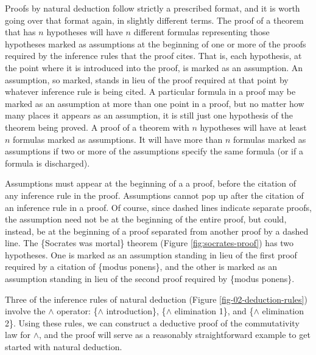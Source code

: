 Proofs by natural deduction follow strictly a prescribed format,
and it is worth going over that format again, in slightly different terms.
The proof of a theorem that has
$n$ hypotheses will have $n$ different
formulas representing those hypotheses
marked as assumptions
at the beginning of one or more of the proofs
required by the inference rules that the proof cites.
That is, each hypothesis, at the point where it is introduced
into the proof, is marked as an assumption.
An assumption, so marked, stands in lieu of the proof
required at that point by whatever inference rule is being cited.
A particular formula in a proof may be marked as an assumption
at more than one point in a proof, but no matter how many places
it appears as an assumption, it is still just
one hypothesis of the theorem being proved.
A proof of a theorem with $n$ hypotheses will have at least $n$
formulas marked as assumptions.
It will have more than $n$ formulas marked as assumptions
if two or more of the assumptions specify the same formula
(or if a formula is discharged).

Assumptions must appear at the beginning of a
a proof, before the citation of any
inference rule in the proof.
Assumptions cannot pop up after the citation
of an inference rule in a proof.
Of course, since dashed
lines indicate separate proofs,
the assumption need not be at the beginning of the entire
proof, but could, instead, be at the beginning of
a proof separated from another proof by a dashed line.
The \{Socrates was mortal\} theorem
(Figure \ref{fig:socrates-proof})
has two hypotheses.
One is marked as an assumption standing in lieu of the first proof
required by a citation of \{modus ponens\},
and the other is marked as an assumption
standing in lieu of the second proof
required by \{modus ponens\}.

Three of the inference rules of natural deduction
(Figure \ref{fig-02-deduction-rules})
involve the $\wedge$ operator:
\{$\wedge$ introduction\},
\{$\wedge$ elimination 1\}, and
\{$\wedge$ elimination 2\}.
Using these rules, we can construct a deductive proof
of the commutativity law for $\wedge$,
and the proof will serve as a reasonably straightforward
example to get started with natural deduction.

